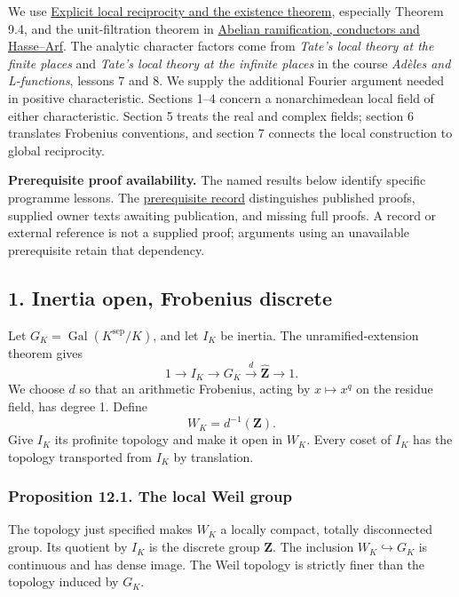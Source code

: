 \documentclass[11pt,a4paper]{article}
\begin{document}
We use \href{../explicit-local-reciprocity-and-existence.html}{Explicit
local reciprocity and the existence theorem}, especially Theorem 9.4,
and the unit-filtration theorem in
\href{../abelian-ramification-conductors-and-hasse-arf.html}{Abelian
ramification, conductors and Hasse--Arf}. The analytic character factors
come from \emph{Tate's local theory at the finite places} and
\emph{Tate's local theory at the infinite places} in the course
\emph{Adèles and L-functions}, lessons 7 and 8. We supply the additional
Fourier argument needed in positive characteristic. Sections 1--4
concern a nonarchimedean local field of either characteristic. Section 5
treats the real and complex fields; section 6 translates Frobenius
conventions, and section 7 connects the local construction to global
reciprocity.

\textbf{Prerequisite proof availability.} The named results below
identify specific programme lessons. The
\href{https://kokunoyumeto.github.io/open-math-courses/courses/NT-CFT/proof-dependencies.html\#lesson-12}{prerequisite
record} distinguishes published proofs, supplied owner texts awaiting
publication, and missing full proofs. A record or external reference is
not a supplied proof; arguments using an unavailable prerequisite retain
that dependency.

\subsection{1. Inertia open, Frobenius
discrete}\label{inertia-open-frobenius-discrete}

Let \(G_K=\operatorname{Gal}(K^{\mathrm{sep}}/K)\), and let \(I_K\) be
inertia. The unramified-extension theorem gives \[
1\longrightarrow I_K\longrightarrow G_K
 \xrightarrow{d}\widehat{\mathbf Z}\longrightarrow1.
\tag{1}
\] We choose \(d\) so that an arithmetic Frobenius, acting by
\(x\mapsto x^q\) on the residue field, has degree 1. Define \[
W_K=d^{-1}(\mathbf Z).
\tag{2}
\] Give \(I_K\) its profinite topology and make it open in \(W_K\).
Every coset of \(I_K\) has the topology transported from \(I_K\) by
translation.

\subsubsection{Proposition 12.1. The local Weil
group}\label{proposition-12.1.-the-local-weil-group}

The topology just specified makes \(W_K\) a locally compact, totally
disconnected group. Its quotient by \(I_K\) is the discrete group
\(\mathbf Z\). The inclusion \(W_K\hookrightarrow G_K\) is continuous
and has dense image. The Weil topology is strictly finer than the
topology induced by \(G_K\).
\end{document}
